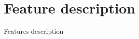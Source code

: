 \graphicspath{ {./content/features/figures/} }

\section{Feature description} 

Features description

